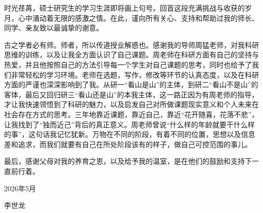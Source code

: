 
\begin{thanks}

时光荏苒，硕士研究生的学习生涯即将画上句号。回首这段充满挑战与收获的岁月，心中涌动着无限的感激之情。在此，谨向所有关心、支持和帮助过我的师长、同学、亲友致以最诚挚的谢意。

古之学者必有师。师者，所以传道授业解惑也。感谢我的导师周猛老师，对我科研思维的训练，以及让我全方面认识了自己课题。周老师在科研方面有自己的坚持与热爱，并且他按照自己的方法引导每一个学生对自己课题的思考，同时也给予了我们非常轻松的学习环境。老师在选题，写作，修改等环节的认真态度，以及在科研方面的严谨也深深影响到了我。从研一“看山是山”的主体，到研二“看山不是山”的客体，最后又回归研三“看山还是山”的本我主体，这一路正因为有周老师的指导，才让我快速领悟到了科研的魅力，以及启发自己对所做课题现实意义和个人未来在社会存在方式的思考。三年地靠近课题，靠近自己，靠近“花开随喜，花落不悲”，让我找到了“独而近己”背后的真正意义。周老师曾说“什么样的年龄就要干什么样的事”，这句话我记忆犹新。万物在不同的阶段，有着不同的位置，思想以及信息差和追求，而我们就要有自己在所处阶段该有的样子，做自己可控范围的事儿。

最后，感谢父母对我的养育之恩，以及给予我的温室，是在他们的鼓励和支持下一直前行着。

\hfill 2026年5月

\hfill 李世龙
\end{thanks}